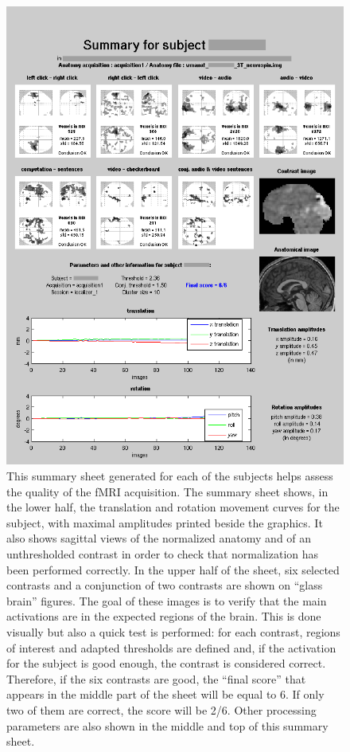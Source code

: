 \documentclass[review]{elsarticle}
\begin{document}
\begin{figure}[ht!]
    \centering
    \includegraphics[scale=0.4]{summary}
    \caption{This summary sheet generated for each of the subjects helps assess the quality of the fMRI acquisition. The summary sheet shows, in the lower half, the translation and rotation movement curves for the subject, with maximal amplitudes printed beside the graphics. It also shows sagittal views of the normalized anatomy and of an unthresholded contrast in order to check that normalization has been performed correctly. In the upper half of the sheet, six selected contrasts and a conjunction of two contrasts are shown on ``glass brain'' figures. The goal of these images is to verify that the main activations are in the expected regions of the brain. This is done visually but also a quick test is performed: for each contrast, regions of interest and adapted thresholds are defined and, if the activation for the subject is good enough, the contrast is considered correct. Therefore, if the six contrasts are good, the ``final score'' that appears in the middle part of the sheet will be equal to 6. If only two of them are correct, the score will be 2/6. Other processing parameters are also shown in the middle and top of this summary sheet.}
    \label{fig:summary}
\end{figure}
\end{document}
